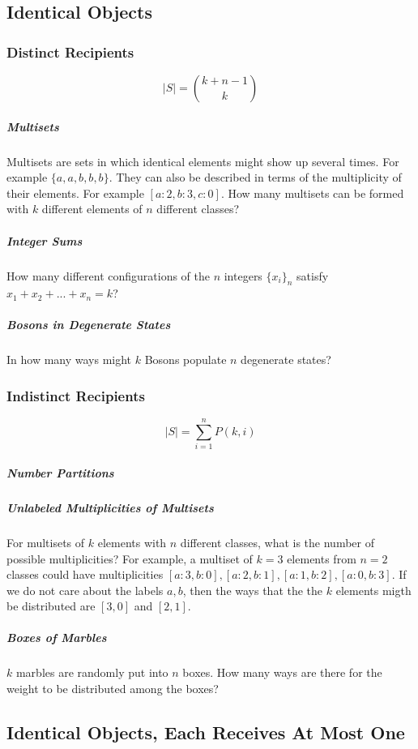\subsection{Identical Objects}

\subsubsection{Distinct Recipients}

\begin{equation}
|S| = {k+n-1 \choose k}
\end{equation}

\subparagraph{Multisets} Multisets are sets in which identical elements might show up several times. For example $\{a,a,b,b,b\}$. They can also be described in terms of the multiplicity of their elements. For example $[a:2, b:3, c:0]$. How many multisets can be formed with $k$ different elements of $n$ different classes?

\subparagraph{Integer Sums} How many different configurations of the $n$ integers $\{ x_i\}_n$ satisfy $x_1 + x_2 + ... + x_n = k$?

\subparagraph{Bosons in Degenerate States} In how many ways might $k$ Bosons populate $n$ degenerate states?


\subsubsection{Indistinct Recipients}

\begin{equation}
|S| = \sum_{i=1}^n P(k,i)
\end{equation}

\subparagraph{Number Partitions}

\subparagraph{Unlabeled Multiplicities of Multisets} For multisets of $k$ elements with $n$ different classes, what is the number of possible multiplicities? For example, a multiset of $k=3$ elements from $n=2$ classes could have multiplicities $[a:3,b:0], [a:2,b:1],[a:1,b:2],[a:0,b:3]$. If we do not care about the labels $a,b$, then the ways that the the $k$ elements migth be distributed are $[3,0]$ and $[2,1]$.

\subparagraph{Boxes of Marbles} $k$ marbles are randomly put into $n$ boxes. How many ways are there for the weight to be distributed among the boxes?



\subsection{Identical Objects, Each Receives At Most One}

